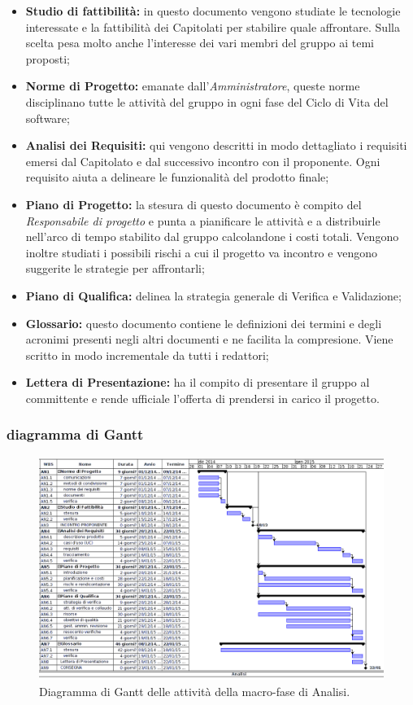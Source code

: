 \begin{itemize}
\item \textbf{Studio di fattibilità:} in questo documento vengono studiate le tecnologie interessate e la fattibilità dei Capitolati per stabilire quale affrontare. Sulla scelta pesa molto anche l'interesse dei vari membri del gruppo ai temi proposti;
\item \textbf{Norme di Progetto:} emanate dall'\textit{Amministratore}, queste norme disciplinano tutte le attività del gruppo in ogni fase del Ciclo di Vita del software;
\item \textbf{Analisi dei Requisiti:} qui vengono descritti in modo dettagliato i requisiti emersi dal Capitolato e dal successivo incontro con il proponente. Ogni requisito aiuta a delineare le funzionalità del prodotto finale;
\item \textbf{Piano di Progetto:} la stesura di questo documento è compito del \textit{Responsabile di progetto} e punta a pianificare le attività e a distribuirle nell'arco di tempo stabilito dal gruppo calcolandone i costi totali. Vengono inoltre studiati i possibili rischi a cui il progetto va incontro e vengono suggerite le strategie per affrontarli;
\item \textbf{Piano di Qualifica:} delinea la strategia generale di Verifica e Validazione;
\item \textbf{Glossario:} questo documento contiene le definizioni dei termini e degli acronimi presenti negli altri documenti e ne facilita la compresione. Viene scritto in modo incrementale da tutti i redattori;
\item \textbf{Lettera di Presentazione:} ha il compito di presentare il gruppo al committente e rende ufficiale l'offerta di prendersi in carico il progetto.
\end{itemize}

\newpage
\subsubsection{diagramma di Gantt}

\begin{figure}[h]
\begin{center}
\includegraphics[width=\textwidth, height=\textheight, keepaspectratio]{img/analisi-gantt.png}
\caption{Diagramma di Gantt delle attività della macro-fase di Analisi.}
\end{center}
\end{figure}
\clearpage

